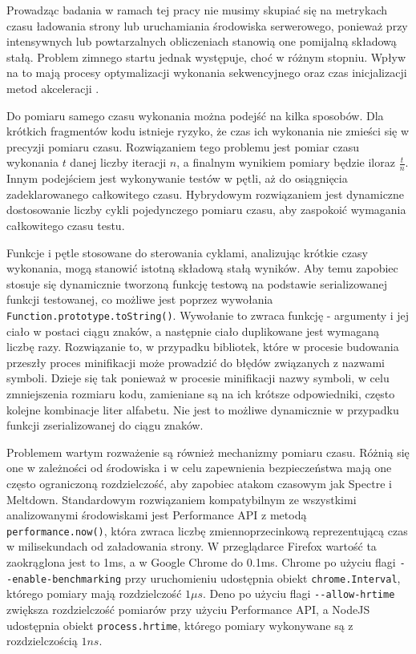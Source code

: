 Prowadząc badania w ramach tej pracy nie musimy skupiać się na metrykach czasu ładowania strony lub uruchamiania środowiska serwerowego, ponieważ przy intensywnych lub powtarzalnych obliczeniach stanowią one pomijalną składową stałą.
Problem zimnego startu jednak występuje, choć w różnym stopniu. Wpływ na to mają procesy optymalizacji wykonania sekwencyjnego oraz czas inicjalizacji metod akceleracji \cite{je-benchmarking}.

Do pomiaru samego czasu wykonania można podejść na kilka sposobów. Dla krótkich fragmentów kodu istnieje ryzyko, że czas ich wykonania nie zmieści się w precyzji pomiaru czasu. Rozwiązaniem tego problemu jest pomiar czasu wykonania $t$ danej liczby iteracji $n$, a finalnym wynikiem pomiary będzie iloraz $\frac{t}{n}$. Innym podejściem jest wykonywanie testów w pętli, aż do osiągnięcia zadeklarowanego całkowitego czasu. Hybrydowym rozwiązaniem jest dynamiczne dostosowanie liczby cykli pojedynczego pomiaru czasu, aby zaspokoić wymagania całkowitego czasu testu.

Funkcje i pętle stosowane do sterowania cyklami, analizując krótkie czasy wykonania, mogą stanowić istotną składową stałą wyników. Aby temu zapobiec stosuje się dynamicznie tworzoną funkcję testową na podstawie serializowanej funkcji testowanej, co możliwe jest poprzez wywołania \lstinline{Function.prototype.toString()}. Wywołanie to zwraca funkcję - argumenty i jej ciało w postaci ciągu znaków, a następnie ciało duplikowane jest wymaganą liczbę razy. Rozwiązanie to, w przypadku bibliotek, które w procesie budowania przeszły proces minifikacji może prowadzić do błędów związanych z nazwami symboli. Dzieje się tak ponieważ w procesie minifikacji nazwy symboli, w celu zmniejszenia rozmiaru kodu, zamieniane są na ich krótsze odpowiedniki, często kolejne kombinacje liter alfabetu. Nie jest to możliwe dynamicznie w przypadku funkcji zserializowanej do ciągu znaków.

Problemem wartym rozważenie są również mechanizmy pomiaru czasu. Różnią się one w zależności od środowiska i w celu zapewnienia bezpieczeństwa mają one często ograniczoną rozdzielczość, aby zapobiec atakom czasowym jak Spectre i Meltdown. Standardowym rozwiązaniem kompatybilnym ze wszystkimi analizowanymi środowiskami jest Performance API z metodą \lstinline{performance.now()}, która zwraca liczbę zmiennoprzecinkową reprezentującą czas w milisekundach od załadowania strony. W przeglądarce Firefox wartość ta zaokrąglona jest to 1ms, a w Google Chrome do 0.1ms. Chrome po użyciu flagi \lstinline{--enable-benchmarking} przy uruchomieniu udostępnia obiekt \lstinline{chrome.Interval}, którego pomiary mają rozdzielczość $1 {\mu}s$. Deno po użyciu flagi \lstinline{--allow-hrtime} zwiększa rozdzielczość pomiarów przy użyciu Performance API, a NodeJS udostępnia obiekt \lstinline{process.hrtime}, którego pomiary wykonywane są z rozdzielczością $1ns$.


